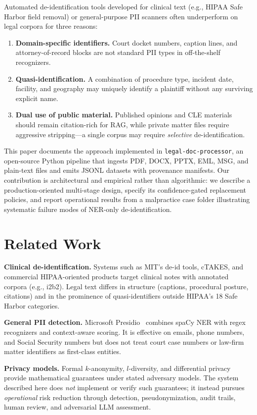 \documentclass[11pt,a4paper]{article}
\begin{document}
Automated de-identification tools developed for clinical text (e.g., HIPAA Safe Harbor field removal) or general-purpose PII scanners often underperform on legal corpora for three reasons:
\begin{enumerate}[noitemsep]
  \item \textbf{Domain-specific identifiers.} Court docket numbers, caption lines, and attorney-of-record blocks are not standard PII types in off-the-shelf recognizers.
  \item \textbf{Quasi-identification.} A combination of procedure type, incident date, facility, and geography may uniquely identify a plaintiff without any surviving explicit name.
  \item \textbf{Dual use of public material.} Published opinions and CLE materials should remain citation-rich for RAG, while private matter files require aggressive stripping---a single corpus may require \emph{selective} de-identification.
\end{enumerate}

This paper documents the approach implemented in \texttt{legal-doc-processor}, an open-source Python pipeline that ingests PDF, DOCX, PPTX, EML, MSG, and plain-text files and emits JSONL datasets with provenance manifests. Our contribution is architectural and empirical rather than algorithmic: we describe a production-oriented multi-stage design, specify its confidence-gated replacement policies, and report operational results from a malpractice case folder illustrating systematic failure modes of NER-only de-identification.

\section{Related Work}

\textbf{Clinical de-identification.} Systems such as MIT's de-id tools, cTAKES, and commercial HIPAA-oriented products target clinical notes with annotated corpora (e.g., i2b2). Legal text differs in structure (captions, procedural posture, citations) and in the prominence of quasi-identifiers outside HIPAA's 18 Safe Harbor categories.

\textbf{General PII detection.} Microsoft Presidio~\cite{presidio} combines spaCy NER with regex recognizers and context-aware scoring. It is effective on emails, phone numbers, and Social Security numbers but does not treat court case numbers or law-firm matter identifiers as first-class entities.

\textbf{Privacy models.} Formal $k$-anonymity, $l$-diversity, and differential privacy provide mathematical guarantees under stated adversary models. The system described here does \emph{not} implement or verify such guarantees; it instead pursues \emph{operational} risk reduction through detection, pseudonymization, audit trails, human review, and adversarial LLM assessment.
\end{document}
